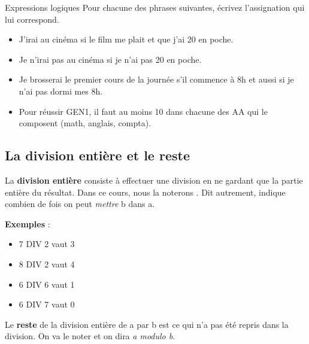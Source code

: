 			\begin{Exercice}{Expressions logiques}
				Pour chacune des phrases suivantes,
				écrivez l'assignation qui lui correspond.
				\begin{itemize}
				\item J’irai au cinéma si le film me plait et que j’ai 20\texteuro{} en poche.
				\item Je n’irai pas au cinéma si je n’ai pas 20\texteuro{} en poche.
				\item Je brosserai le premier cours de la journée s’il commence à 8h et aussi si je n’ai pas dormi mes 8h.
				\item Pour réussir GEN1, il faut au moins 10 dans chacune des AA qui le composent (math, anglais, compta).	
				\end{itemize}
			\end{Exercice}
			
		\subsection{La division entière et le reste}
		
			La \textbf{division entière} consiste à effectuer une division
			en ne gardant que la partie entière du résultat.
			Dans ce cours, nous la noterons .
			Dit autrement, 
			indique combien de fois on peut \emph{mettre} b dans a.
			
			\begin{minipage}{2cm}
			\textbf{Exemples} :	
			\\
			\end{minipage}
			\begin{minipage}{9cm}
			\begin{multicols}{2}
			\begin{itemize}
				\item 7 DIV 2 vaut 3
				\item 8 DIV 2 vaut 4
				\item 6 DIV 6 vaut 1
				\item 6 DIV 7 vaut 0
			\end{itemize}
			\end{multicols}
			\end{minipage}
			
			Le \textbf{reste} de la division entière de a par b
			est ce qui n'a pas été repris dans la division.
			On va le noter 
			et on dira \emph{a modulo b}.
	
